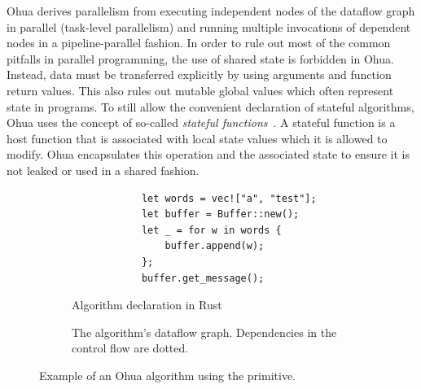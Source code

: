 Ohua derives parallelism from executing independent nodes of the dataflow graph in parallel (task-level parallelism) and running multiple invocations of dependent nodes in a pipeline-parallel fashion.
In order to rule out most of the common pitfalls in parallel programming, the use of shared state is forbidden in Ohua.
Instead, data must be transferred explicitly by using arguments and function return values.
This also rules out mutable global values which often represent state in programs.
To still allow the convenient declaration of stateful algorithms, Ohua uses the concept of so-called \emph{stateful functions}~\cite{ertel2019stclang}.
A stateful function is a host function that is associated with local state values which it is allowed to modify.
Ohua encapsulates this operation and the associated state to ensure it is not leaked or used in a shared fashion.

\begin{figure}[h]
    \begin{subfigure}[h]{.5\textwidth}
        \begin{verbatim}
            let words = vec!["a", "test"];
            let buffer = Buffer::new();
            let _ = for w in words {
                buffer.append(w);
            };
            buffer.get_message();
        \end{verbatim}
        \caption{Algorithm declaration in Rust}
        \label{fig:backend:smap:algo}
    \end{subfigure}
    \begin{subfigure}[h]{.5\textwidth}
        \caption{The algorithm's dataflow graph. Dependencies in the control flow are dotted.}
        \label{fig:backend:smap:dfg}
    \end{subfigure}
    \caption{Example of an Ohua algorithm using the  primitive.}%
    \label{fig:background:smap}
\end{figure}

